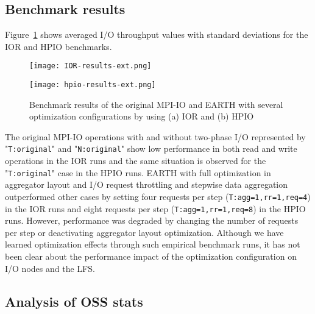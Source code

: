 \documentclass{jhps}
\begin{document}
\subsection{Benchmark results}

Figure~\ref{fig:IOR_HPIO_PERF} shows averaged I/O throughput values
with standard deviations for the IOR and HPIO benchmarks. 
%
\begin{figure}[htb]
\centering
\begin{minipage}[t]{0.46\textwidth}
 \centering
 \texttt{[image: IOR-results-ext.png]}
 \label{fig:IOR_PERF}
\end{minipage}
%
\noindent
\begin{minipage}[t]{0.46\textwidth}
 \texttt{[image: hpio-results-ext.png]}
 \label{fig:HPIO_PERF}
\end{minipage}
\caption{
Benchmark results of the original MPI-IO and EARTH with several optimization
configurations by using (a) IOR and (b) HPIO}
\label{fig:IOR_HPIO_PERF}
\end{figure}
%

The original MPI-IO operations with and without two-phase I/O represented by
"{\tt T:original}" and "{\tt N:original}" show low performance in both read and write
operations in the IOR runs and the same situation is observed
for the "{\tt T:original}" case in the HPIO runs.
EARTH with full optimization in aggregator layout and I/O request throttling
and stepwise data aggregation outperformed other cases by setting four requests per step
({\tt T:agg=1,rr=1,req=4}) in the IOR runs and eight requests per step
({\tt T:agg=1,rr=1,req=8}) in the HPIO runs.
However, performance was degraded by changing the number of requests per step
or deactivating aggregator layout optimization.
Although we have learned optimization effects through such empirical benchmark runs,
it has not been clear about the performance impact of the optimization configuration
on I/O nodes and the LFS.

\subsection{Analysis of OSS stats}
\end{document}
